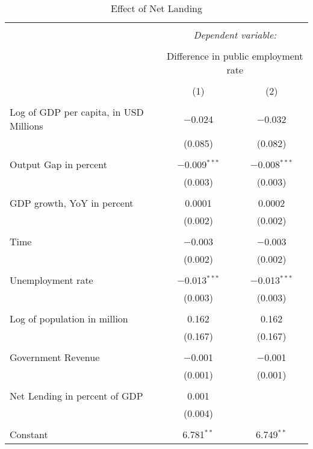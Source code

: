 
\begin{table}[!htbp] \centering 
  \caption{Effect of Net Landing} 
  \label{} 
\begin{tabular}{@{\extracolsep{5pt}}lcc} 
\\[-1.8ex]\hline 
\hline \\[-1.8ex] 
 & \multicolumn{2}{c}{\textit{Dependent variable:}} \\ 
\cline{2-3} 
\\[-1.8ex] & \multicolumn{2}{c}{Difference in public employment rate} \\ 
\\[-1.8ex] & (1) & (2)\\ 
\hline \\[-1.8ex] 
 Log of GDP per capita, in USD Millions & $-$0.024 & $-$0.032 \\ 
  & (0.085) & (0.082) \\ 
  & & \\ 
 Output Gap in percent & $-$0.009$^{***}$ & $-$0.008$^{***}$ \\ 
  & (0.003) & (0.003) \\ 
  & & \\ 
 GDP growth, YoY in percent & 0.0001 & 0.0002 \\ 
  & (0.002) & (0.002) \\ 
  & & \\ 
 Time & $-$0.003 & $-$0.003 \\ 
  & (0.002) & (0.002) \\ 
  & & \\ 
 Unemployment rate & $-$0.013$^{***}$ & $-$0.013$^{***}$ \\ 
  & (0.003) & (0.003) \\ 
  & & \\ 
 Log of population in million & 0.162 & 0.162 \\ 
  & (0.167) & (0.167) \\ 
  & & \\ 
 Government Revenue & $-$0.001 & $-$0.001 \\ 
  & (0.001) & (0.001) \\ 
  & & \\ 
 Net Lending in percent of GDP & 0.001 &  \\ 
  & (0.004) &  \\ 
  & & \\ 
 Constant & 6.781$^{**}$ & 6.749$^{**}$ \\ 

\end{tabular}
\end{table}
